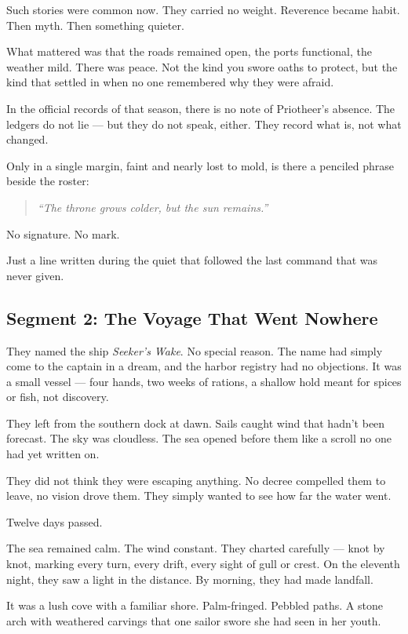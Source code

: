 \documentclass[9pt]{article}
\begin{document}
Such stories were common now. They carried no weight. Reverence became habit. Then myth. Then something quieter.

What mattered was that the roads remained open, the ports functional, the weather mild. There was peace. Not the kind you swore oaths to protect, but the kind that settled in when no one remembered why they were afraid.

In the official records of that season, there is no note of Priotheer’s absence. The ledgers do not lie — but they do not speak, either. They record what is, not what changed.

Only in a single margin, faint and nearly lost to mold, is there a penciled phrase beside the roster:

\begin{quote}
\emph{“The throne grows colder, but the sun remains.”}
\end{quote}

No signature. No mark.

Just a line written during the quiet that followed the last command that was never given.

\newpage

\subsection*{Segment 2: The Voyage That Went Nowhere}

They named the ship \emph{Seeker’s Wake}. No special reason. The name had simply come to the captain in a dream, and the harbor registry had no objections. It was a small vessel — four hands, two weeks of rations, a shallow hold meant for spices or fish, not discovery.

They left from the southern dock at dawn. Sails caught wind that hadn’t been forecast. The sky was cloudless. The sea opened before them like a scroll no one had yet written on.

They did not think they were escaping anything. No decree compelled them to leave, no vision drove them. They simply wanted to see how far the water went.

Twelve days passed.

The sea remained calm. The wind constant. They charted carefully — knot by knot, marking every turn, every drift, every sight of gull or crest. On the eleventh night, they saw a light in the distance. By morning, they had made landfall.

It was a lush cove with a familiar shore. Palm-fringed. Pebbled paths. A stone arch with weathered carvings that one sailor swore she had seen in her youth.
\end{document}
